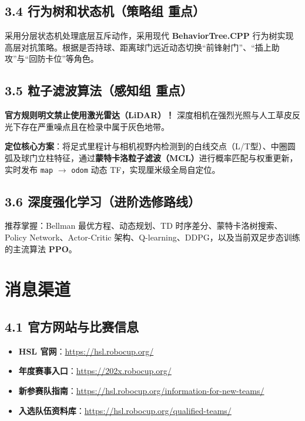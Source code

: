 \documentclass[11pt,a4paper]{ctexart}
\begin{document}
\subsection{3.4 行为树和状态机（策略组 重点）}
采用分层状态机处理底层互斥动作，采用现代 \textbf{BehaviorTree.CPP} 行为树实现高层对抗策略。根据是否持球、距离球门远近动态切换“前锋射门”、“插上助攻”与“回防卡位”等角色。

\subsection{3.5 粒子滤波算法（感知组 重点）}
\begin{noticebox}[规则硬性约束]
\textbf{官方规则明文禁止使用激光雷达（LiDAR）！} 深度相机在强烈光照与人工草皮反光下存在严重噪点且在检录中属于灰色地带。
\end{noticebox}
\textbf{定位核心方案}：将足式里程计与相机视野内检测到的白线交点（L/T型）、中圈圆弧及球门立柱特征，通过\textbf{蒙特卡洛粒子滤波（MCL）}进行概率匹配与权重更新，实时发布 \texttt{map} $\to$ \texttt{odom} 动态 TF，实现厘米级全局自定位。

\subsection{3.6 深度强化学习（进阶选修路线）}
推荐掌握：Bellman 最优方程、动态规划、TD 时序差分、蒙特卡洛树搜索、Policy Network、Actor-Critic 架构、Q-learning、DDPG，以及当前双足步态训练的主流算法 \textbf{PPO}。

\newpage
\section{消息渠道}

\subsection{4.1 官方网站与比赛信息}
\begin{itemize}[leftmargin=*]
    \item \textbf{HSL 官网}：\url{https://hsl.robocup.org/}
    \item \textbf{年度赛事入口}：\url{https://202x.robocup.org/}
    \item \textbf{新参赛队指南}：\url{https://hsl.robocup.org/information-for-new-teams/}
    \item \textbf{入选队伍资料库}：\url{https://hsl.robocup.org/qualified-teams/}
\end{itemize}
\end{document}
